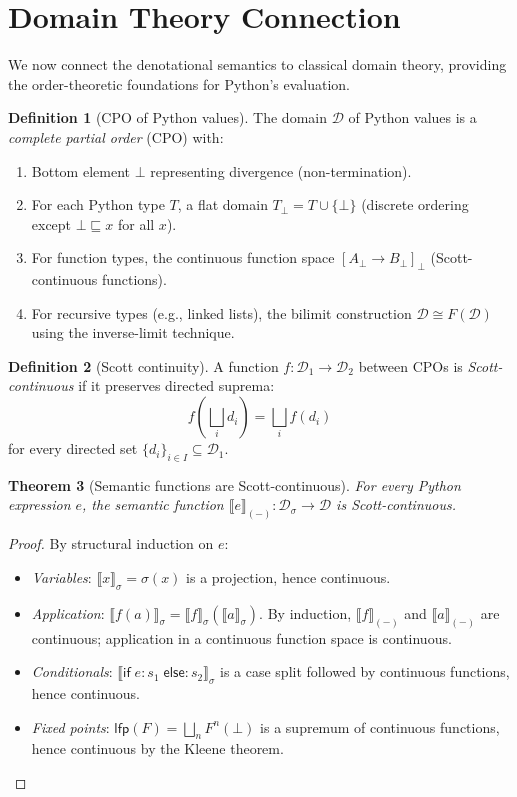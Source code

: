 \documentclass[11pt,a4paper]{report}
\theoremstyle{definition}
\newtheorem{definition}{Definition}[chapter]
\theoremstyle{plain}
\newtheorem{theorem}[definition]{Theorem}
\newcommand{\den}[1]{\llbracket #1 \rrbracket}
\begin{document}
\section{Domain Theory Connection}

We now connect the denotational semantics to classical domain theory,
providing the order-theoretic foundations for Python's evaluation.

\begin{definition}[CPO of Python values]
\label{def:cpo-pyval}
The domain $\mathcal{D}$ of Python values is a \emph{complete partial order}
(CPO) with:
\begin{enumerate}
  \item Bottom element $\bot$ representing divergence (non-termination).
  \item For each Python type $T$, a flat domain $T_\bot = T \cup \{\bot\}$
    (discrete ordering except $\bot \sqsubseteq x$ for all $x$).
  \item For function types, the continuous function space
    $[A_\bot \to B_\bot]_\bot$ (Scott-continuous functions).
  \item For recursive types (e.g., linked lists), the bilimit construction
    $\mathcal{D} \cong F(\mathcal{D})$ using the inverse-limit technique.
\end{enumerate}
\end{definition}

\begin{definition}[Scott continuity]
A function $f : \mathcal{D}_1 \to \mathcal{D}_2$ between CPOs is
\emph{Scott-continuous} if it preserves directed suprema:
\[
  f\!\left(\bigsqcup_i d_i\right) = \bigsqcup_i f(d_i)
\]
for every directed set $\{d_i\}_{i \in I} \subseteq \mathcal{D}_1$.
\end{definition}

\begin{theorem}[Semantic functions are Scott-continuous]
\label{thm:scott-continuous}
For every Python expression $e$, the semantic function
$\den{e}_{(-)} : \mathcal{D}_\sigma \to \mathcal{D}$ is Scott-continuous.
\end{theorem}
\begin{proof}
By structural induction on $e$:
\begin{itemize}
  \item \emph{Variables}: $\den{x}_\sigma = \sigma(x)$ is a projection, hence
    continuous.
  \item \emph{Application}: $\den{f(a)}_\sigma = \den{f}_\sigma(\den{a}_\sigma)$.
    By induction, $\den{f}_{(-)}$ and $\den{a}_{(-)}$ are continuous; application
    in a continuous function space is continuous.
  \item \emph{Conditionals}: $\den{\mathsf{if}\;e:s_1\;\mathsf{else}:s_2}_\sigma$
    is a case split followed by continuous functions, hence continuous.
  \item \emph{Fixed points}: $\mathsf{lfp}(F) = \bigsqcup_n F^n(\bot)$ is a
    supremum of continuous functions, hence continuous by the Kleene theorem.
\end{itemize}
\end{proof}
\end{document}
